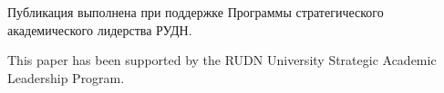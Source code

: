 \begin{Russian}
\def\acknowledgmentsname{Благодарности}
\end{Russian}

\begin{acknowledgments}




\begin{Russian}
Публикация выполнена при поддержке Программы стратегического
академического лидерства РУДН.
%
\end{Russian}
\begin{English}
This paper has been supported by the RUDN University Strategic Academic Leadership Program.

\end{English}

\end{acknowledgments}

